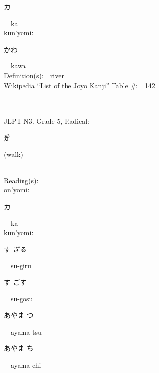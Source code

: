 \begin{multicols}{2}
{\hspace*{2em}}{\begin{CJK}{UTF8}{min} カ \end{CJK}}\ \ ka\ \ \\
{\hspace*{1em}}kun'yomi:\ \ \\
{\hspace*{2em}}{\begin{CJK}{UTF8}{min} かわ \end{CJK}}\ \ kawa\ \ \\
Definition(s):\ \ river \\
Wikipedia ``List of the J\=oy\=o Kanji'' Table \#:\ \ 142 \\
\ \ \\
{\fontsize{34pt}{40pt}  }\ \ \\  %
{JLPT N3, Grade 5, Radical:\ \ {\begin{CJK}{UTF8}{min} 辵 \end{CJK}} (walk) } \\
Reading(s):\ \ \\
{\hspace*{1em}}on'yomi:\ \ \\
{\hspace*{2em}}{\begin{CJK}{UTF8}{min} カ \end{CJK}}\ \ ka\ \ \\
{\hspace*{1em}}kun'yomi:\ \ \\
{\hspace*{2em}}{\begin{CJK}{UTF8}{min} す-ぎる \end{CJK}}\ \ su-giru\ \ \\
{\hspace*{2em}}{\begin{CJK}{UTF8}{min} す-ごす \end{CJK}}\ \ su-gosu\ \ \\
{\hspace*{2em}}{\begin{CJK}{UTF8}{min} あやま-つ \end{CJK}}\ \ ayama-tsu\ \ \\
{\hspace*{2em}}{\begin{CJK}{UTF8}{min} あやま-ち \end{CJK}}\ \ ayama-chi\ \ \\

\end{multicols}

